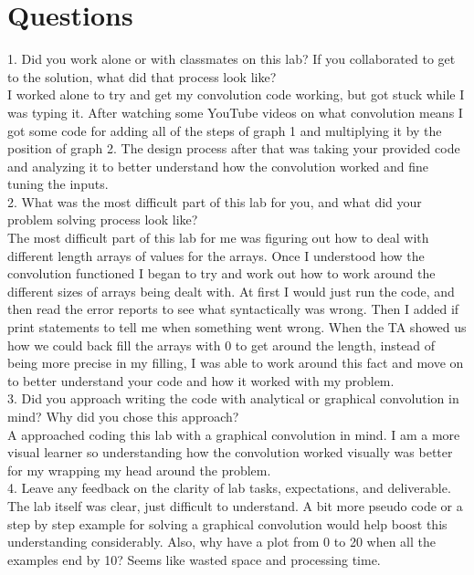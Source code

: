 \documentclass[11pt,a4]{article}
\begin{document}
\section{Questions}
1. Did you work alone or with classmates on this lab? If you collaborated to get to the solution, what did that process look like?
\\
I worked alone to try and get my convolution code working, but got stuck while I was typing it. After watching some YouTube videos on what convolution means I got some code for adding all of the steps of graph 1 and multiplying it by the position of graph 2. The design process after that was taking your provided code and analyzing it to better understand how the convolution worked and fine tuning the inputs.
\\
2. What was the most difficult part of this lab for you, and what did your problem solving process look like?
\\
The most difficult part of this lab for me was figuring out how to deal with different length arrays of values for the arrays. Once I understood how the convolution functioned I began to try and work out how to work around the different sizes of arrays being dealt with. At first I would just run the code, and then read the error reports to see what syntactically was wrong. Then I added if print statements to tell me when something went wrong. When the TA showed us how we could back fill the arrays with 0 to get around the length, instead of being more precise in my filling, I was able to work around this fact and move on to better understand your code and how it worked with my problem.
\\
3. Did you approach writing the code with analytical or graphical convolution in mind? Why did you chose this approach?
\\
A approached coding this lab with a graphical convolution in mind. I am a more visual learner so understanding how the convolution worked visually was better for my wrapping my head around the problem.
\\
4. Leave any feedback on the clarity of lab tasks, expectations, and deliverable.
\\
The lab itself was clear, just difficult to understand. A bit more pseudo code or a step by step example for solving a graphical convolution would help boost this understanding considerably. Also, why have a plot from 0 to 20 when all the examples end by 10? Seems like wasted space and processing time.
\end{document}
